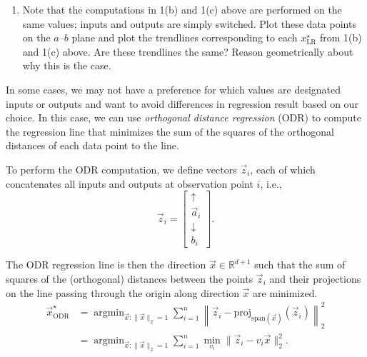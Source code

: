 \documentclass[10pt]{article}
\newcommand{\RR}{\mathbb{R}}
\DeclareMathOperator*{\argmin}{argmin}
\begin{document}
\begin{enumerate}[label=(\alph*)]
\item Note that the computations in 1(b) and 1(c) above are performed on the same values; inputs and outputs are simply switched. Plot these data points on the $a$--$b$ plane and plot the trendlines corresponding to each $x^\star_{\text{LR}}$ from 1(b) and 1(c) above. Are these trendlines the same? Reason geometrically about why this is the case.
\end{enumerate}

\bigskip

In some cases, we may not have a preference for which values are designated inputs or outputs and want to avoid differences in regression result based on our choice. In this case, we can use \textit{orthogonal distance regression} (ODR) to compute the regression line that minimizes the sum of the squares of the orthogonal distances of each data point to the line.

To perform the ODR computation, we define vectors $\vec{z}_i$, each of which concatenates all inputs and outputs at observation point $i$, i.e.,
\begin{equation}
\vec{z}_i = \begin{bmatrix} \uparrow \\ \vec{a}_i \\ \downarrow \\ b_i \end{bmatrix}.
\end{equation}

The ODR regression line is then the direction $\vec{x} \in \RR^{d+1}$ such that the sum of squares of the (orthogonal) distances between the points $\vec{z}_i$ and their projections on the line passing through the origin along direction $\vec{x}$ are minimized.
\begin{align}
\vec{x}^\star_{\text{ODR}} &= \argmin_{\vec{x}:\|\vec{x}\|_2=1} \sum_{i=1}^{n} \left\| \vec{z}_i - \text{proj}_{\text{span}(\vec{x})}(\vec{z}_i) \right\|_2^2 \\
&= \argmin_{\vec{x}:\|\vec{x}\|_2=1} \sum_{i=1}^{n} \min_{v_i} \|\vec{z}_i - v_i \vec{x}\|_2^2.
\end{align}
\end{document}
